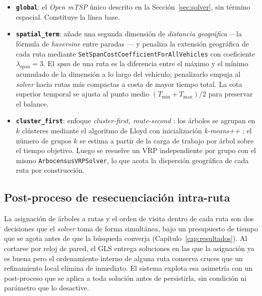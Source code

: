 \begin{itemize}
  \item \textbf{\texttt{global}}: el \textit{Open mTSP} único descrito en la
        Sección~\ref{sec:solver}, sin término espacial. Constituye la línea base.
  \item \textbf{\texttt{spatial\_term}}: añade una segunda dimensión de
        \textit{distancia geográfica} ---la fórmula de \textit{haversine} entre
        paradas \citep{sinnott1984virtues}--- y penaliza la
        extensión geográfica de cada ruta mediante
        \texttt{SetSpanCostCoefficientForAllVehicles} con coeficiente
        $\lambda_{\text{span}} = 3$. El \textit{span} de una ruta es la diferencia
        entre el máximo y el mínimo acumulado de la dimensión a lo largo del
        vehículo; penalizarlo empuja al \textit{solver} hacia rutas más compactas a costa
        de mayor tiempo total. La cota superior temporal se ajusta al punto medio
        $(T_{\min} + T_{\max})/2$ para preservar el balance.
  \item \textbf{\texttt{cluster\_first}}: enfoque \textit{cluster-first,
        route-second} \citep{fisher1981generalized}: los árboles se agrupan en $k$
        clústeres mediante el algoritmo de Lloyd \citep{lloyd1982least} con
        inicialización \textit{k-means++} \citep{arthur2007kmeans}; el número de
        grupos $k$ se estima a partir de la carga de trabajo por árbol sobre el
        tiempo objetivo. Luego se resuelve un VRP independiente por grupo con el
        mismo \texttt{ArbocensusVRPSolver}, lo que acota la dispersión geográfica
        de cada ruta por construcción.
\end{itemize}

\subsection{Post-proceso de resecuenciación intra-ruta}
\label{sec:postpass}

La asignación de árboles a rutas y el orden de visita dentro de cada ruta son dos
decisiones que el \textit{solver} toma de forma simultánea, bajo un presupuesto de
tiempo que se agota antes de que la búsqueda converja
(Capítulo~\ref{cap:resultados}). Al cortarse por reloj de pared, el GLS entrega
soluciones en las que la asignación ya es buena pero el ordenamiento interno de
alguna ruta conserva cruces que un refinamiento local elimina de inmediato. El
sistema explota esa asimetría con un post-proceso que se aplica a toda solución
antes de persistirla, sin condición ni parámetro que lo desactive.

